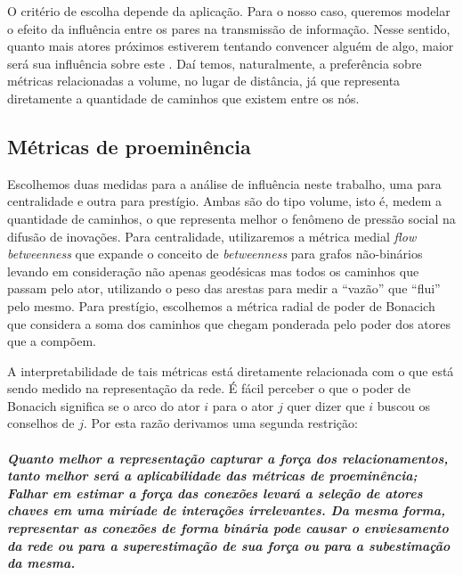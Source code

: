 \documentclass{article}
\begin{document}
O critério de escolha depende da aplicação. Para o nosso caso, queremos modelar
o efeito da influência entre os pares na transmissão de informação. Nesse
sentido, quanto mais atores próximos estiverem tentando convencer alguém de
algo, maior será sua influência sobre este \cite{Watts2007}. Daí temos,
naturalmente, a preferência sobre métricas relacionadas a volume, no lugar de distância, já que
representa diretamente a quantidade de caminhos que existem entre os nós.

\subsection{Métricas de proeminência}

Escolhemos duas medidas para a análise de influência neste trabalho, uma para
centralidade e outra para prestígio. Ambas são do tipo volume, isto é, medem a
quantidade de caminhos, o que representa melhor o fenômeno de pressão social na
difusão de inovações. Para centralidade, utilizaremos a métrica medial
\textit{flow betweenness} que expande o conceito de \textit{betweenness} para
grafos não-binários \cite{Freeman1991} levando em consideração não apenas
geodésicas mas todos os caminhos que passam pelo ator, utilizando o peso das
arestas para medir a ``vazão'' que ``flui'' pelo mesmo. Para prestígio,
escolhemos a métrica radial de poder de Bonacich \cite{Bonacich1987} que
considera a soma dos caminhos que chegam ponderada pelo poder dos atores que a
compõem.

A interpretabilidade de tais métricas está diretamente relacionada com o que está
sendo medido na representação da rede. É fácil perceber o que o poder de Bonacich
significa se o arco do ator $i$ para o ator $j$ quer dizer que $i$ buscou os
conselhos de $j$. Por esta razão derivamos uma segunda restrição:

\paragraph{\emph{Quanto melhor a representação capturar a força dos
relacionamentos, tanto melhor será a aplicabilidade das métricas de proeminência;
Falhar em estimar a força das conexões levará a seleção de atores chaves em uma
miríade de interações irrelevantes. Da mesma forma, representar as conexões de
forma binária pode causar o enviesamento da rede ou para a superestimação de sua
força ou para a subestimação da mesma.}}




\end{document}
